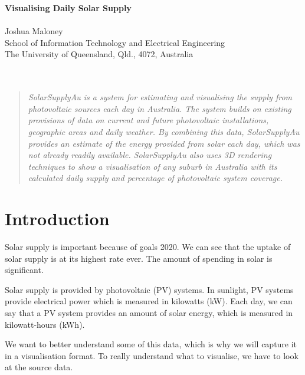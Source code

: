 \documentclass[10pt, a4paper]{article}
\begin{document}
\begin{center}
\Large
\textbf{Visualising Daily Solar Supply } \\ 
\hfill\\
\large
Joshua Maloney \\
School of Information Technology and Electrical Engineering \\
The University of Queensland, Qld., 4072, Australia \\
\hfill\\
\hfill\\
\end{center}


\begin{multicols}{2}

\begin{abstract}
\textit{
	SolarSupplyAu is a system for estimating and visualising the supply from photovoltaic sources each day in Australia. The system builds on existing provisions of data on current and future photovoltaic installations, geographic areas and daily weather. By combining this data, SolarSupplyAu provides an estimate of the energy provided from solar each day, which was not already readily available. SolarSupplyAu also uses 3D rendering techniques to show a visualisation of any suburb in Australia with its calculated daily supply and percentage of photovoltaic system coverage.	
}
\end{abstract}

\section{Introduction}

Solar supply is important because of goals 2020. We can see that the uptake of solar supply is at its highest rate ever. The amount of spending in solar is significant. 

Solar supply is provided by photovoltaic (PV) systems. In sunlight, PV systems provide electrical power which is measured in kilowatts (kW). Each day, we can say that a PV system provides an amount of solar energy, which is measured in kilowatt-hours (kWh).

We want to better understand some of this data, which is why we will capture it in a visualisation format. To really understand what to visualise, we have to look at the source data. 


\end{multicols}
\end{document}
